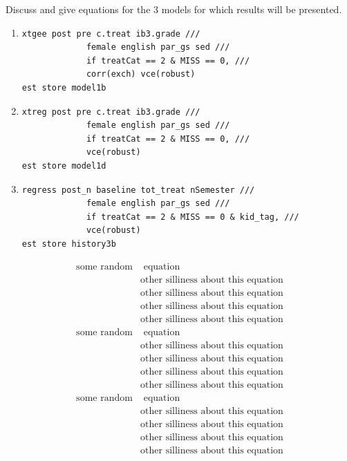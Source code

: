 \documentclass[a0,landscape]{a0poster}
\begin{document}
\begin{multicols}{3}
Discuss and give equations for the 3 models for which results will be presented.

\begin{enumerate}
\item \begin{verbatim}
xtgee post pre c.treat ib3.grade ///
			 female english par_gs sed ///
			 if treatCat == 2 & MISS == 0, ///
			 corr(exch) vce(robust)
est store model1b
\end{verbatim}
\item \begin{verbatim}
xtreg post pre c.treat ib3.grade ///
			 female english par_gs sed ///
			 if treatCat == 2 & MISS == 0, ///
			 vce(robust)
est store model1d
\end{verbatim}
\item \begin{verbatim}
regress post_n baseline tot_treat nSemester ///
			 female english par_gs sed ///
 			 if treatCat == 2 & MISS == 0 & kid_tag, ///
			 vce(robust)
est store history3b
\end{verbatim}
\end{enumerate}

\begin{align}
\text{some random} & \text{ equation} \label{eq:model1} \\
& \text{other silliness about this equation} \nonumber \\
& \text{other silliness about this equation} \nonumber \\
& \text{other silliness about this equation} \nonumber \\
& \text{other silliness about this equation} \nonumber \\
\text{some random} & \text{ equation} \label{eq:model2} \\
& \text{other silliness about this equation} \nonumber \\
& \text{other silliness about this equation} \nonumber \\
& \text{other silliness about this equation} \nonumber \\
& \text{other silliness about this equation} \nonumber \\
\text{some random} & \text{ equation} \label{eq:model3} \\
& \text{other silliness about this equation} \nonumber \\
& \text{other silliness about this equation} \nonumber \\
& \text{other silliness about this equation} \nonumber \\
& \text{other silliness about this equation} \nonumber
\end{align} 


\end{multicols}
\end{document}
